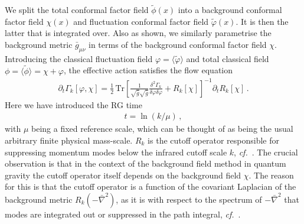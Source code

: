 \documentclass[11pt,draft]{book} %
\newcommand\cf{\textit{cf.}\ }
\newcommand{\vp}{\varphi}
\begin{document}
We split the total conformal factor field $\tilde\phi(x)$ into a background conformal factor
field $\chi(x)$ and fluctuation conformal factor field $\tilde\vp(x)$.
It is then the latter that is integrated over. Also as shown, we similarly parametrise the background
metric $\bar{g}_{\mu\nu}$ in terms of the background conformal factor field $\chi$.
Introducing the classical fluctuation field $\vp = \langle \tilde \vp \rangle$ and total classical
field $\phi = \langle \tilde \phi \rangle = \chi + \vp$, the effective action  satisfies the flow equation
\begin{align}
  \partial_t \Gamma_k[\vp,\chi] =
  \frac{1}{2} \, \mathrm{Tr} \left[\frac{1}{\sqrt{\bar g}\sqrt{\bar g}}
    \frac{\delta^2\Gamma_k}
         {\delta \vp \delta \vp}+ R_k[\chi]\right]^{-1} \partial_t R_k[\chi]\,.
  \label{equ:flowGamma}
\end{align}
Here we have introduced the RG time
\begin{align}
  t = \ln(k/\mu) \,,
  \label{time}
\end{align}
with $\mu$ being a fixed reference scale, which can be thought of as being the usual arbitrary
finite physical mass-scale.
$R_k$ is the cutoff operator responsible for suppressing momentum modes below the
infrared cutoff scale $k$, \cf \cite{Wetterich:1992yh, Morris:1993qb}.
The crucial observation is that in the context of the background field method in quantum gravity the
cutoff operator itself depends on the background field $\chi$.
The reason for this is that the cutoff operator is a function of the covariant Laplacian of the
background metric $R_k\left(-\bar \nabla^2\right)$, as it is with respect to the spectrum of
$-\bar\nabla^2$ that modes are integrated out or suppressed in the path integral,
\cf \cite{Reuter:2008wj,Reuter:2009kq}.
\end{document}
